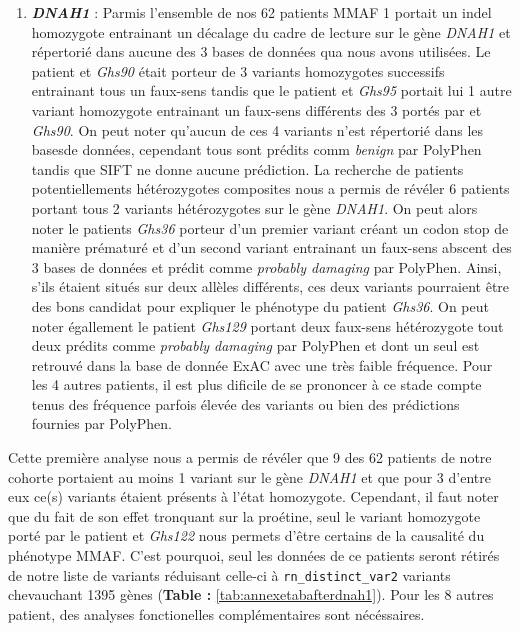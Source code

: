 \documentclass[12pt,twoside]{reedthesis}
\providecommand{\tightlist}{%
  \setlength{\itemsep}{0pt}\setlength{\parskip}{0pt}}
\theoremstyle{definition}
\theoremstyle{definition}
\theoremstyle{remark}
\begin{document}
  \begin{enumerate}
  \def\labelenumi{\arabic{enumi}.}
  \tightlist
  \item
    \textbf{\emph{DNAH1}} : Parmis l'ensemble de nos 62 patients MMAF 1
    portait un indel homozygote entrainant un décalage du cadre de lecture
    sur le gène \emph{DNAH1} et répertorié dans aucune des 3 bases de
    données qua nous avons utilisées. Le patient et \emph{Ghs90} était
    porteur de 3 variants homozygotes successifs entrainant tous un
    faux-sens tandis que le patient et \emph{Ghs95} portait lui 1 autre
    variant homozygote entrainant un faux-sens différents des 3 portés par
    et \emph{Ghs90}. On peut noter qu'aucun de ces 4 variants n'est
    répertorié dans les basesde données, cependant tous sont prédits comm
    \emph{benign} par PolyPhen tandis que SIFT ne donne aucune prédiction.
    La recherche de patients potentiellements hétérozygotes composites
    nous a permis de révéler 6 patients portant tous 2 variants
    hétérozygotes sur le gène \emph{DNAH1}. On peut alors noter le
    patients \emph{Ghs36} porteur d'un premier variant créant un codon
    stop de manière prématuré et d'un second variant entrainant un
    faux-sens abscent des 3 bases de données et prédit comme
    \emph{probably damaging} par PolyPhen. Ainsi, s'ils étaient situés sur
    deux allèles différents, ces deux variants pourraient être des bons
    candidat pour expliquer le phénotype du patient \emph{Ghs36}. On peut
    noter égallement le patient \emph{Ghs129} portant deux faux-sens
    hétérozygote tout deux prédits comme \emph{probably damaging} par
    PolyPhen et dont un seul est retrouvé dans la base de donnée ExAC avec
    une très faible fréquence. Pour les 4 autres patients, il est plus
    dificile de se prononcer à ce stade compte tenus des fréquence parfois
    élevée des variants ou bien des prédictions fournies par PolyPhen.
  \end{enumerate}
  
  Cette première analyse nous a permis de révéler que 9 des 62 patients de
  notre cohorte portaient au moins 1 variant sur le gène \emph{DNAH1} et
  que pour 3 d'entre eux ce(s) variants étaient présents à l'état
  homozygote. Cependant, il faut noter que du fait de son effet tronquant
  sur la proétine, seul le variant homozygote porté par le patient et
  \emph{Ghs122} nous permets d'être certains de la causalité du phénotype
  MMAF. C'est pourquoi, seul les données de ce patients seront rétirés de
  notre liste de variants réduisant celle-ci à \texttt{rn\_distinct\_var2}
  variants chevauchant 1395 gènes (\textbf{Table :}
  \ref{tab:annexetabafterdnah1}). Pour les 8 autres patient, des analyses
  fonctionelles complémentaires sont nécéssaires.
  
\end{document}
